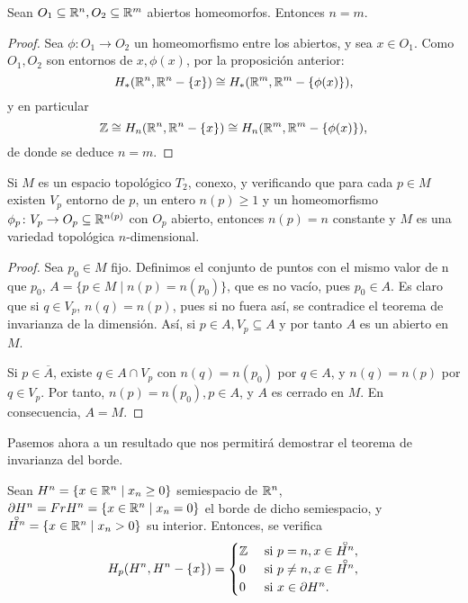 \begin{theorem}
  Sean $O_1 \subseteq \mathbb{R}^n, O_2 \subseteq \mathbb{R}^m$ abiertos homeomorfos. Entonces $n = m$.
\end{theorem}

\begin{proof}
  Sea $\phi \colon O_1 \to O_2$ un homeomorfismo entre los abiertos, y sea $x \in O_1$. Como $O_1, O_2$ son entornos de $x, \phi(x)$,
  por la proposición anterior:
  \[H_*(\mathbb{R}^n, \mathbb{R}^n - \{x\}) \cong H_*(\mathbb{R}^m, \mathbb{R}^m - \{\phi(x)\}), \]
  y en particular
  \[ \mathbb{Z} \cong H_n(\mathbb{R}^n, \mathbb{R}^n - \{x\}) \cong H_n(\mathbb{R}^m, \mathbb{R}^m - \{\phi(x)\}), \]
  de donde se deduce $n = m$.
\end{proof}

\begin{corollary}
  Si $M$ es un espacio topológico $T_2$, conexo, y verificando que para cada $p \in M$ existen $V_p$ entorno de $p$, un entero
  $n(p) \geq 1$ y un homeomorfismo $\phi_p \colon V_p \to O_p \subseteq \mathbb{R}^{n(p)}$ con $O_p$ abierto, entonces
  $n(p) = n$ constante y $M$ es una variedad topológica $n$-dimensional.
\end{corollary}

\begin{proof}
  Sea $p_0 \in M$ fijo. Definimos el conjunto de puntos con el mismo valor de n que $p_0$, $A = \{p \in M \mid n(p) = n(p_0)\}$,
  que es no vacío, pues $p_0 \in A$. Es claro que si $q \in V_p$, $n(q) = n(p)$, pues si no fuera así, se contradice el teorema
  de invarianza de la dimensión. Así, si $p \in A, V_p \subseteq A$ y por tanto $A$ es un abierto en $M$.

  Si $p \in \overline{A}$, existe $q \in A \cap V_p$ con $n(q) = n(p_0)$ por $q \in A$, y $n(q) = n(p)$ por $q \in V_p$.
  Por tanto, $n(p) = n(p_0), p \in A$, y $A$ es cerrado en $M$. En consecuencia, $A = M$.
\end{proof}

Pasemos ahora a un resultado que nos permitirá demostrar el teorema de invarianza del borde.

\begin{lemma}
  Sean $H^n = \{x \in \mathbb{R}^n \mid x_n \geq 0 \}$ semiespacio de $\mathbb{R}^n$, $\partial H^n = Fr H^n = \{x \in \mathbb{R}^n \mid x_n = 0\}$
  el borde de dicho semiespacio, y $\interior{H^n} = \{x \in \R^n \mid x_n > 0\}$ su interior. Entonces, se verifica
  \[H_p(H^n, H^n - \{x\}) =
    \begin{cases} \Z &\text{ si } p = n, x \in \interior{H^n}, \\
                  0  &\text{ si } p \neq n, x \in \interior{H^n}, \\
                  0  &\text{ si } x \in \partial H^n.  \end{cases} \]
\end{lemma}

